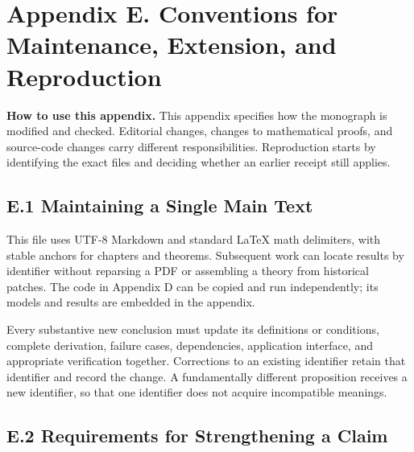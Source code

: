 \documentclass[
  english,
  11pt,
  oneside]{book}
\begin{document}
\chapter{Appendix E. Conventions for Maintenance, Extension, and Reproduction}\label{appendix-e}

\textbf{How to use this appendix.} This appendix specifies how the monograph is modified and checked. Editorial changes, changes to mathematical proofs, and source-code changes carry different responsibilities. Reproduction starts by identifying the exact files and deciding whether an earlier receipt still applies.

\section{E.1 Maintaining a Single Main Text}\label{e.1-maintaining-a-single-main-text}

This file uses UTF-8 Markdown and standard LaTeX math delimiters, with stable anchors for chapters and theorems. Subsequent work can locate results by identifier without reparsing a PDF or assembling a theory from historical patches. The code in Appendix D can be copied and run independently; its models and results are embedded in the appendix.

Every substantive new conclusion must update its definitions or conditions, complete derivation, failure cases, dependencies, application interface, and appropriate verification together. Corrections to an existing identifier retain that identifier and record the change. A fundamentally different proposition receives a new identifier, so that one identifier does not acquire incompatible meanings.

\section{E.2 Requirements for Strengthening a Claim}\label{e.2-requirements-for-strengthening-a-claim}
\end{document}
